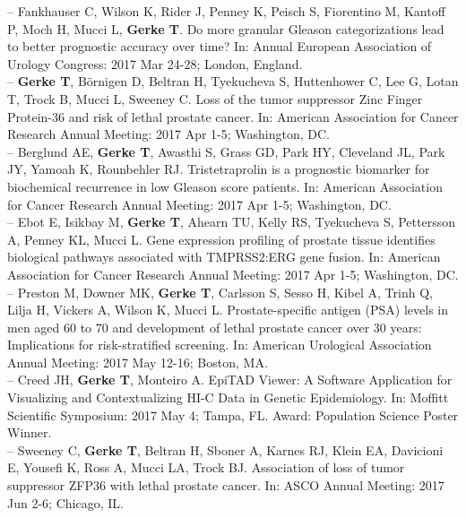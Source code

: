 \documentclass[11pt, a4paper]{article} %
\begin{document}
-- Fankhauser C, Wilson K, Rider J, Penney K, Peisch S, Fiorentino M, Kantoff P, Moch H, Mucci L, {\bf Gerke T}. Do more granular Gleason categorizations lead to better prognostic accuracy over time? In: Annual European Association of Urology Congress: 2017 Mar 24-28; London, England.\\

-- {\bf Gerke T},  B\"{o}rnigen D, Beltran H, Tyekucheva S, Huttenhower C, Lee G, Lotan T, Trock B, Mucci L, Sweeney C. Loss of the tumor suppressor Zinc Finger Protein-36 and risk of lethal prostate cancer. In: American Association for Cancer Research Annual Meeting: 2017 Apr 1-5; Washington, DC.\\

-- Berglund AE, {\bf Gerke T}, Awasthi S, Grass GD, Park HY, Cleveland JL, Park JY, Yamoah K, Rounbehler RJ. Tristetraprolin is a prognostic biomarker for biochemical recurrence in low Gleason score patients. In: American Association for Cancer Research Annual Meeting: 2017 Apr 1-5; Washington, DC.\\

-- Ebot E, Isikbay M, {\bf Gerke T}, Ahearn TU, Kelly RS, Tyekucheva S, Pettersson A, Penney KL, Mucci L. Gene expression profiling of prostate tissue identifies biological pathways associated with TMPRSS2:ERG gene fusion. In: American Association for Cancer Research Annual Meeting: 2017 Apr 1-5; Washington, DC.\\

-- Preston M, Downer MK, {\bf Gerke T}, Carlsson S, Sesso H, Kibel A, Trinh Q, Lilja H, Vickers A, Wilson K, Mucci L. Prostate-specific antigen (PSA) levels in men aged 60 to 70 and development of lethal prostate cancer over 30 years: Implications for risk-stratified screening. In: American Urological Association Annual Meeting: 2017 May 12-16; Boston, MA.\\

-- Creed JH, {\bf Gerke T}, Monteiro A. EpiTAD Viewer: A Software Application for Visualizing and Contextualizing HI-C Data in Genetic Epidemiology. In: Moffitt Scientific Symposium: 2017 May 4; Tampa, FL. Award: Population Science Poster Winner.\\

-- Sweeney C, {\bf Gerke T}, Beltran H, Sboner A, Karnes RJ, Klein EA, Davicioni E, Yousefi K, Ross A, Mucci LA, Trock BJ. Association of loss of tumor suppressor ZFP36 with lethal prostate cancer. In: ASCO Annual Meeting: 2017 Jun 2-6; Chicago, IL.\\
\end{document}

